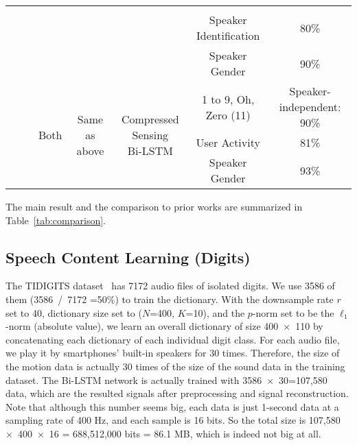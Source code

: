 \begin{landscape}
\begin{table}[h]
\begin{tabular}{cccccc}
			&&&&& \\ \cline{5-6}
			&&&&Speaker Identification& 80\%\\ \cline{5-6}
			&&&&Speaker Gender& 90\%\\
			\midrule[0.5pt]
			\multirow{4}{*}{~~~\systemName} & \multirow{4}{*}{Both} & \multirow{4}{*}{Same as above} & \multirow{3}{*}{\parbox{1.8cm}{\centering Compressed Sensing\\Bi-LSTM} } &1 to 9, Oh, Zero (11) &Speaker-independent: 90\%\\ \cline{5-6}
			&&&&User Activity& 81\%\\ \cline{5-6}
			&&&&Speaker Gender& 93\%\\
			\midrule[0.3pt]\bottomrule[1pt]
		\end{tabular}
	\end{table}
\end{landscape}

%
The main result and the comparison to prior works are summarized in Table~\ref{tab:comparison}. 


\subsection{Speech Content Learning  (Digits)}

The TIDIGITS dataset~\cite{leonard1993tidigits} has 7172 audio files of isolated digits. We use 3586 of them (3586~/~7172 =50\%) to train the dictionary. With the downsample rate $r$ set to 40, dictionary size set to ($N$=400, $K$=10), and the $p$-norm set to be the $\ell_1$-norm (absolute value), we learn an overall dictionary of size 400~$\times$~110 by concatenating each dictionary of each individual digit class. 
%
For each audio file, we play it by smartphones' built-in speakers for 30 times. Therefore, the size of the motion data is actually 30 times of the size of the sound data in the training dataset. The Bi-LSTM network is actually trained with 3586~$\times$~30=107,580 data, which are the resulted signals after preprocessing and signal reconstruction. Note that although this number seems big, each data is just 1-second data at a sampling rate of 400 Hz, and each sample is 16 bits. So the total size is 107,580~$\times$~400~$\times$~16 = 688,512,000 bits = 86.1 MB, which is indeed not big at all.


